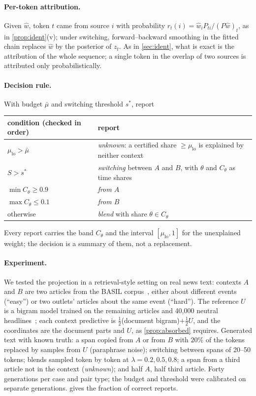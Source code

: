 \documentclass[11pt]{article}
\theoremstyle{definition}
\theoremstyle{remark}
\begin{document}
\paragraph{Per-token attribution.} Given $\hat w$, token $t$ came from source $i$ with probability
$r_t(i)=\hat w_iP_{ti}/(P\hat w)_t$, as in \cref{prop:ident}(v); under switching, forward--backward
smoothing in the fitted chain replaces $\hat w$ by the posterior of $z_t$. As in \cref{sec:ident},
what is exact is the attribution of the whole sequence; a single token in the overlap of two
sources is attributed only probabilistically.

\paragraph{Decision rule.} With budget $\bar\mu$ and switching threshold $s^*$, report
\begin{center}
\begin{tabular}{@{}ll@{}}
\toprule
condition (checked in order) & report\\
\midrule
$\mu_{\mathrm{lo}}>\bar\mu$ & \emph{unknown}: a certified share $\ge\mu_{\mathrm{lo}}$ is explained by neither context\\
$S>s^*$ & \emph{switching} between $A$ and $B$, with $\theta$ and $C_\theta$ as time shares\\
$\min C_\theta\ge0.9$ & \emph{from $A$}\\
$\max C_\theta\le0.1$ & \emph{from $B$}\\
otherwise & \emph{blend} with share $\theta\in C_\theta$\\
\bottomrule
\end{tabular}
\end{center}
Every report carries the band $C_\theta$ and the interval $[\mu_{\mathrm{lo}},1]$ for the unexplained
weight; the decision is a summary of them, not a replacement.

\paragraph{Experiment.} We tested the projection in a retrieval-style setting on real news text:
contexts $A$ and $B$ are two articles from the BASIL corpus~\cite{BASIL2019}, either about different
events (``easy'') or two outlets' articles about the same event (``hard''). The reference $U$ is a
bigram model trained on the remaining articles and 40{,}000 neutral headlines~\cite{BABE2021}; each
context predictive is $\tfrac12$(document bigram)$+\tfrac12U$, and the coordinates are the
document parts and $U$, as \cref{prop:absorbed} requires. Generated text with known truth: a span
copied from $A$ or from $B$ with $20\%$ of the tokens replaced by samples from $U$ (paraphrase noise);
switching between spans of 20--50 tokens; blends sampled token by token at $\lambda=0.2,0.5,0.8$; a
span from a third article not in the context (\emph{unknown}); and half $A$, half third article.
Forty generations per case and pair type; the budget and threshold were calibrated on separate
generations.  gives the fraction of correct reports.
\end{document}

